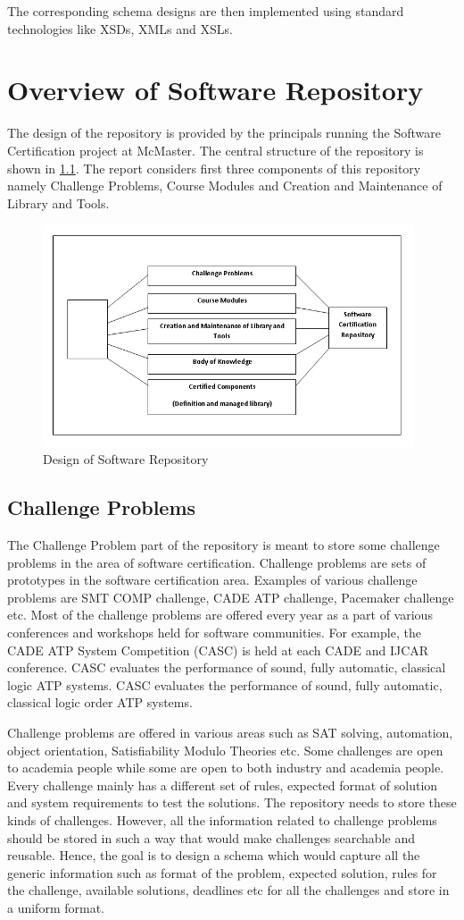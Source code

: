 \documentclass[11pt,letterpaper]{report}
\begin{document}
The corresponding schema designs are then implemented using standard technologies like XSDs, XMLs and XSLs.

\chapter{Overview of Software Repository}
 The design of the repository is provided by the principals running the Software Certification project at McMaster. The central structure of the repository is shown in \ref{Fig:1}. The report considers first three components of this repository namely Challenge Problems, Course Modules and Creation and Maintenance of Library and Tools.
\begin{figure}[ht]
\centering
\includegraphics[width=110mm]{Images/Overview_SW_Repo.jpg}
\caption{Design of Software Repository}
\label{Fig:1}
\end{figure}

 \section{Challenge Problems}
 The Challenge Problem part of the repository is meant to store some challenge problems in the area of software certification. Challenge problems are sets of prototypes in the software certification area. Examples of various challenge problems are SMT COMP challenge, CADE ATP challenge, Pacemaker challenge etc. Most of the challenge problems are offered every year as a part of various conferences and workshops held for software communities. For example, the CADE ATP System Competition (CASC) is held at each CADE and IJCAR conference. CASC evaluates the performance of sound, fully automatic, classical logic ATP systems. CASC evaluates the performance of sound, fully automatic, classical logic order ATP systems. 
 
 Challenge problems are offered in various areas such as SAT solving, automation, object orientation, Satisfiability Modulo Theories etc. Some challenges are open to academia people while some are open to both industry and academia people. Every challenge mainly has a different set of rules, expected format of solution and system requirements to test the solutions. The repository needs to store these kinds of challenges. However, all the information related to challenge problems should be stored in such a way that would make challenges searchable and reusable. Hence, the goal is to design a schema which would capture all the generic information such as format of the problem, expected solution, rules for the challenge, available solutions, deadlines etc for all the challenges and store in a uniform format.
\end{document}
